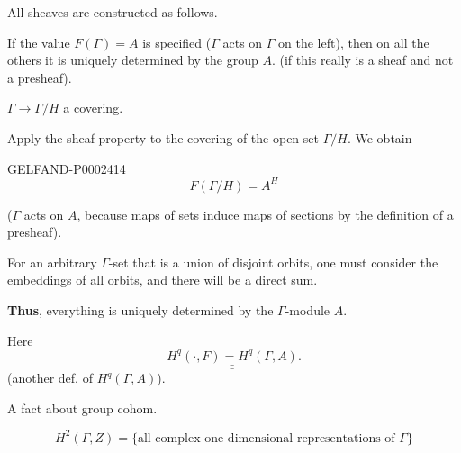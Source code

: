 All sheaves are constructed as follows.



If the value $F (\Gamma)=A$ is specified ($\Gamma$ acts on $\Gamma$ on the left), then on all the others it is uniquely determined by the group $A$. (if this really is a sheaf and not a presheaf).



$\Gamma\longrightarrow\Gamma/H$ \qquad a covering.



Apply the sheaf property to the covering of the open set $\Gamma/H$. We obtain



\begin{GelfandAdjacentEvidence}{GELFAND-P000241}{4}
\begin{equation*}F (\Gamma/H)=A^H\end{equation*}



\end{GelfandAdjacentEvidence}

($\Gamma$ acts on $A$, because maps of sets induce maps of sections by the definition of a presheaf).





For an arbitrary $\Gamma$-set that is a union of disjoint orbits, one must consider the embeddings of all orbits, and there will be a direct sum.



\textbf{Thus}, everything is uniquely determined by the $\Gamma$-module $A$.



Here
\begin{equation*}
\underline{\underline{H^q (\cdot, F)=H^q (\Gamma, A)}}.
\end{equation*}
(another def. of $H^q (\Gamma, A)$).



A fact about group cohom.



\begin{equation*}
H^2(\Gamma, Z)=\{\text{all complex one-dimensional representations of }\Gamma\}
\end{equation*}



